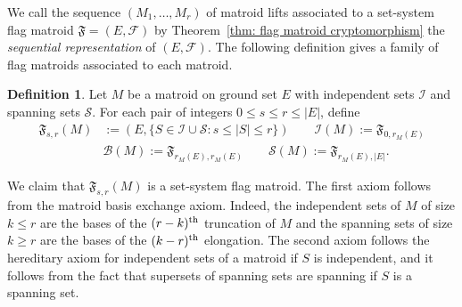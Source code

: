 \documentclass[12pt]{article}
\theoremstyle{definition}
\newtheorem{defn}[thm]{Definition}
\begin{document}


We call the sequence $(M_1, \dots, M_r)$ of matroid lifts associated to a set-system flag matroid $\mathfrak{F} = (E,\mathcal{F})$ by Theorem~\ref{thm: flag matroid cryptomorphism}
the \emph{sequential representation} of $(E,\mathcal{F})$.
The following definition gives a family of flag matroids associated to each matroid.

\begin{defn}\label{defn: flag matroids from matroid}
    Let $M$ be a matroid on ground set $E$ with independent sets $\mathcal{I}$ and spanning sets $\mathcal{S}$.
    For each pair of integers $0 \le s \le r \le |E|$, define
    \begin{align*}
        \mathfrak{F}_{s,r}(M) &:= (E,\{S \in \mathcal{I} \cup \mathcal{S}: s \le |S| \le r\}) \qquad
        \mathcal{I}(M):=\mathfrak{F}_{0,r_M(E)} \\
        &\mathcal{B}(M) := \mathfrak{F}_{r_M(E),r_M(E)} \qquad
        \mathcal{S}(M):=\mathfrak{F}_{r_M(E),|E|}.
    \end{align*}
\end{defn}
We claim that $\mathfrak{F}_{s,r}(M)$ is a set-system flag matroid.
The first axiom follows from the matroid basis exchange axiom.
Indeed, the independent sets of $M$ of size $k \le r$ are the bases
of the $(r-k)^{\rm th}$ truncation of $M$ and the spanning sets of size $k \ge r$ are the bases of the $(k-r)^{\rm th}$ elongation.
The second axiom follows the hereditary axiom for independent sets of a matroid if $S$ is independent, and it follows from the fact that supersets of spanning sets are spanning if $S$ is a spanning set.
\end{document}

